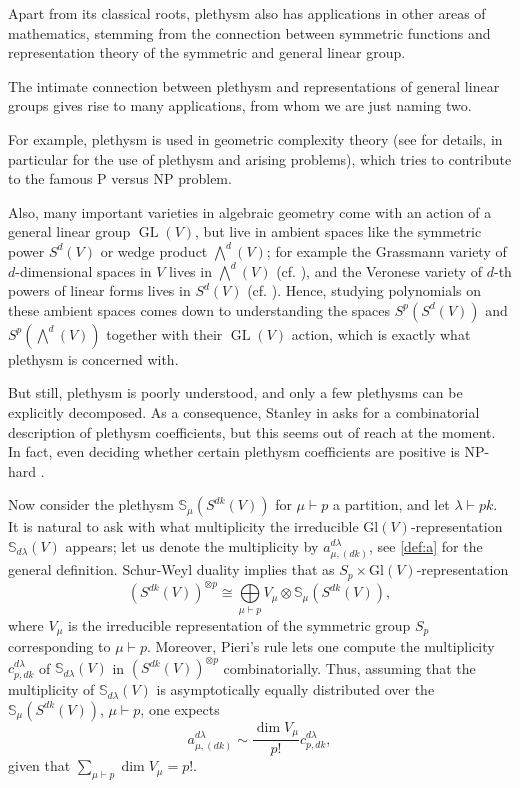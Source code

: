 \documentclass[a4paper]{amsart}
\DeclareMathOperator{\GL}{\mathrm{GL}}
\begin{document}
Apart from its classical roots, plethysm also has applications in other areas of mathematics, stemming from the connection between symmetric functions and representation theory of the symmetric and general linear group.

The intimate connection between plethysm and representations of general linear groups gives rise to many applications, from whom we are just naming two.

For example, plethysm is used in geometric complexity theory (see \cite{Lan17} for details, in particular \cite[8.8-10]{Lan17} for the use of plethysm and arising problems),
which tries to contribute to the famous P versus NP problem.

Also, many important varieties in algebraic geometry come with an action of a general linear group $\GL(V)$,
but live in ambient spaces like the symmetric power $S^d(V)$ or wedge product $\bigwedge^d(V)$;
for example the Grassmann variety of $d$-dimensional spaces in $V$ lives in $\bigwedge^d(V)$ (cf. \cite[ch. 9]{Fu97}), and the Veronese variety of $d$-th powers of linear forms lives in $S^d(V)$ (cf. \cite[11.3, 13.3]{FH04}).
Hence, studying polynomials on these ambient spaces comes down to understanding the spaces $S^p(S^d(V))$ and $S^p(\bigwedge^d(V))$ together with their $\GL(V)$ action, which is exactly what plethysm is concerned with.

But still, plethysm is poorly understood, and only a few plethysms can be explicitly decomposed.
As a consequence, Stanley in \cite[Problem 9]{Sta99b} asks for a combinatorial description of plethysm coefficients, but this seems out of reach at the moment.
In fact, even deciding whether certain plethysm coefficients are positive is NP-hard \cite[Thm. 3.5]{FI20}.

Now consider the plethysm $\mathbb{S}_\mu(S^{dk}(V))$ for $\mu\vdash p$ a partition, and let $\lambda\vdash pk$.
It is natural to ask with what multiplicity the irreducible $\mathrm{Gl}(V)$-representation $\mathbb{S}_{d\lambda}(V)$ appears; let us denote the multiplicity by $a_{\mu,(dk)}^{d\lambda}$, see \cref{def:a} for the general definition.
Schur-Weyl duality implies that as $S_p\times\mathrm{Gl}(V)$-representation
\begin{displaymath}
	(S^{dk}(V))^{\otimes p}\cong\bigoplus\limits_{\mu\vdash p}V_\mu\otimes\mathbb S_{\mu}(S^{dk}(V)),
\end{displaymath}
where $V_\mu$ is the irreducible representation of the symmetric group $S_p$ corresponding to $\mu\vdash p$.
Moreover, Pieri's rule lets one compute the multiplicity $c^{d\lambda}_{p,dk}$ of $\mathbb{S}_{d\lambda}(V)$ in $(S^{dk}(V))^{\otimes p}$ combinatorially.
Thus, assuming that the multiplicity of $\mathbb{S}_{d\lambda}(V)$ is asymptotically equally distributed over the $\mathbb{S}_{\mu}(S^{dk}(V))$, $\mu\vdash p$, one expects
\begin{displaymath}
	a^{d\lambda}_{\mu,(dk)}\sim \frac{\dim V_\mu}{p!}c^{d\lambda}_{p,dk},
\end{displaymath}
given that $\sum_{\mu\vdash p}\dim V_\mu=p!$.
\end{document}
